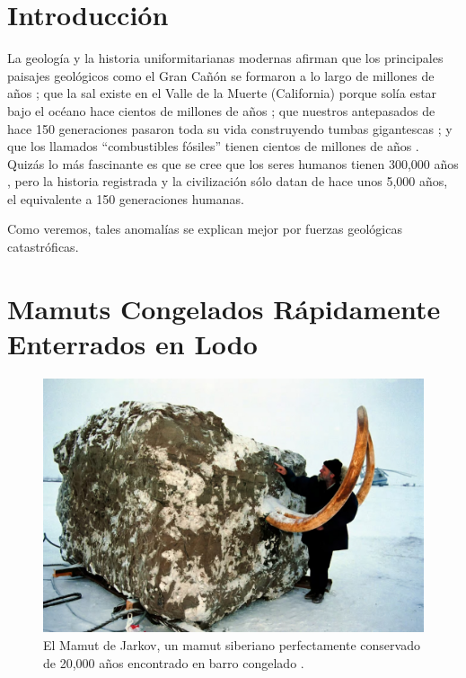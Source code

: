 \documentclass[10pt,twocolumn,letterpaper]{article}
\begin{document}

\section{Introducción}

La geología y la historia uniformitarianas modernas afirman que los principales paisajes geológicos como el Gran Cañón se formaron a lo largo de millones de años \cite{143}; que la sal existe en el Valle de la Muerte (California) porque solía estar bajo el océano hace cientos de millones de años \cite{144}; que nuestros antepasados de hace 150 generaciones pasaron toda su vida construyendo tumbas gigantescas \cite{29,70}; y que los llamados “combustibles fósiles” tienen cientos de millones de años \cite{104}. Quizás lo más fascinante es que se cree que los seres humanos tienen 300,000 años \cite{145}, pero la historia registrada y la civilización sólo datan de hace unos 5,000 años, el equivalente a 150 generaciones humanas.

Como veremos, tales anomalías se explican mejor por fuerzas geológicas catastróficas.

\section{Mamuts Congelados Rápidamente Enterrados en Lodo}

\begin{figure}[t]
\begin{center}
   \includegraphics[width=1\linewidth]{jarkov-mammoth.jpg}
\end{center}
   \caption{El Mamut de Jarkov, un mamut siberiano perfectamente conservado de 20,000 años encontrado en barro congelado \cite{51}.}
\label{fig:1}
\label{fig:onecol}
\end{figure}
\end{document}
